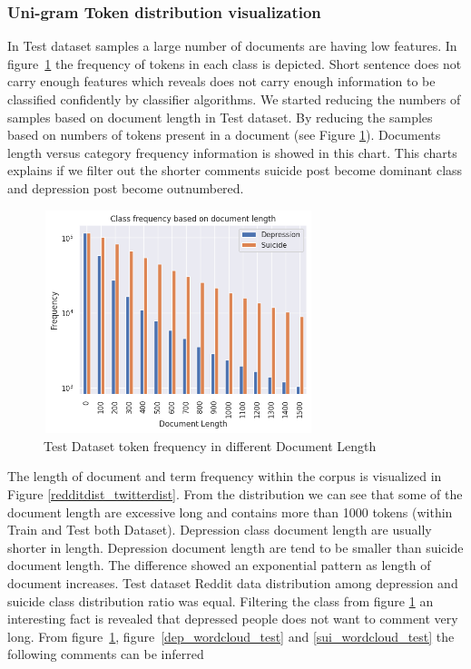 \documentclass[sn-mathphys,Numbered]{sn-jnl}%
\theoremstyle{thmstyleone}%
\theoremstyle{thmstyletwo}%
\theoremstyle{thmstylethree}%
\begin{document}
\subsubsection{Uni-gram Token distribution visualization}
In Test dataset samples a large number of documents are having low features. In figure~\ref{fig_Test_Dataset_token_frequency} the frequency of tokens in each class is depicted. Short sentence does not carry enough features which reveals does not carry enough information to be classified confidently by classifier algorithms. We started reducing the numbers of samples based on document length in Test dataset. By reducing the samples based on numbers of tokens present in a document (see Figure \ref{fig_Test_Dataset_token_frequency}). Documents length versus category frequency information is showed in this chart. This charts explains if we filter out the shorter comments suicide post become dominant class and depression post become outnumbered. 
%
\begin{figure}[H]
\centering
\includegraphics[height=6.5cm, width=0.7\textwidth]{doc_len.png}
\caption{Test Dataset token frequency in different Document Length}
\label{fig_Test_Dataset_token_frequency}
\end{figure}
%
The length of document and term frequency within the corpus is visualized in Figure \ref{redditdist_twitterdist}. From the distribution we can see that some of the document length are excessive long and contains more than 1000 tokens (within Train and Test both Dataset). Depression class document length are usually shorter in length. Depression document length are tend to be smaller than suicide document length. The difference showed an exponential pattern as length of document increases. Test dataset Reddit data distribution among depression and suicide class distribution ratio was equal. Filtering the class from figure \ref{fig_Test_Dataset_token_frequency} an interesting fact is revealed that depressed people does not want to comment very long. From figure~\ref{fig_Test_Dataset_token_frequency},  figure~\ref{dep_wordcloud_test} and \ref{sui_wordcloud_test} the following comments can be inferred
\end{document}
